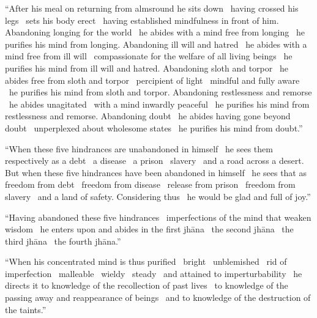 \begin{justify}
  “After his meal on returning from almsround he sits down \breathmark\ having crossed his legs \breathmark\ sets his body erect \breathmark\ having established mindfulness in front of him. Abandoning longing
  for the world \breathmark\ he abides with a mind free from longing \breathmark\ he purifies his mind from longing. Abandoning ill will and hatred \breathmark\ he abides with a mind free from ill will \breathmark\ compassionate for the welfare of all living beings \breathmark\ he purifies his mind from ill will and hatred. Abandoning sloth and torpor \breathmark\ he abides free from sloth and torpor \breathmark\ percipient of light \breathmark\ mindful and fully aware \breathmark\ he purifies his mind from sloth and torpor. Abandoning restlessness and remorse \breathmark\ he abides unagitated \breathmark\ with a mind inwardly peaceful \breathmark\ he purifies his mind from restlessness and remorse. Abandoning doubt \breathmark\ he abides having gone beyond doubt \breathmark\ unperplexed about wholesome states \breathmark\ he purifies his mind from doubt.”
\end{justify}

\suttaRef{[MN 107]}

\begin{justify}
  “When these five hindrances are unabandoned in himself \breathmark\ he sees them respectively as a debt \breathmark\ a disease \breathmark\ a prison \breathmark\ slavery \breathmark\ and a road across a desert. But when these five hindrances have been abandoned in himself \breathmark\ he sees that as freedom from debt \breathmark\ freedom from disease \breathmark\ release from prison \breathmark\ freedom from slavery \breathmark\ and a land of safety. Considering thus \breathmark\ he would be glad and full of joy.”
\end{justify}

\begin{justify}
  “Having abandoned these five hindrances \breathmark\ imperfections of the mind that weaken wisdom \breathmark\ he enters upon and abides in the first jhāna \breathmark\ the second jhāna \breathmark\ the third jhāna \breathmark\ the fourth jhāna.”
\end{justify}

\begin{justify}
  “When his concentrated mind is thus purified \breathmark\ bright \breathmark\ unblemished \breathmark\ rid of imperfection \breathmark\ malleable \breathmark\ wieldy \breathmark\ steady \breathmark\ and attained to imperturbability \breathmark\ he directs it to knowledge of the recollection of past lives \breathmark\ to knowledge of the passing away and reappearance of beings \breathmark\ and to knowledge of the destruction of the taints.”
\end{justify}

